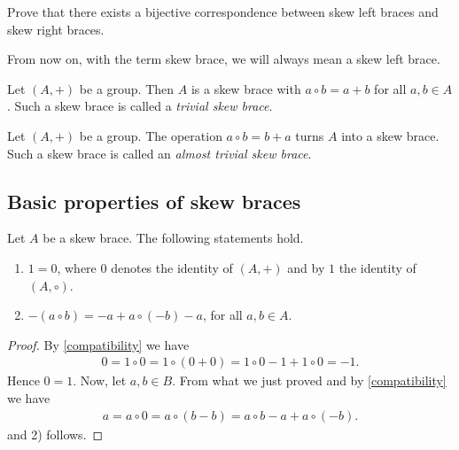    \begin{exercise}
        Prove that there exists a bijective correspondence between skew left braces
        and skew right braces.
   \end{exercise}

    \begin{convention}
        From now on, with the term skew brace, we will always mean a skew left brace.
    \end{convention}

        \begin{example}
        Let $(A,+)$ be a group. Then $A$ is a skew brace with
            $a\circ b=a+b$ for all $a,b\in A$. Such a skew brace is called a \emph{trivial skew brace}.
    \end{example}
    
    \begin{example}
          Let $(A,+)$ be a group. The operation $a\circ b=b+a$ turns $A$ into a skew brace. Such a skew brace is called an \emph{almost trivial skew brace}. 
    \end{example}

    
    \subsection{Basic properties of skew braces}

    \begin{lemma}\label{lem:propskew}
        Let $A$ be a skew brace. The following statements hold.
        \begin{enumerate}
            \item $1=0$, where $0$ denotes the identity of $(A,+)$ and by $1$ the identity of $(A,\circ)$.
            \item $-(a\circ b) = - a + a\circ(- b) - a$, for all $a,b \in A$.
        \end{enumerate}
    \end{lemma}
    \begin{proof}
        By \eqref{compatibility} we have
        \begin{align*}
            0= 1\circ 0 = 1 \circ (0+0) = 1\circ 0 -1 + 1 \circ 0 = -1.
        \end{align*}
        Hence $0=1$. 
        Now, let $a,b\in B$. From what we just proved and by \eqref{compatibility}
        we have 
        \begin{align*}
            a = a \circ 0 = a\circ (b-b) = a\circ b - a + a\circ (-b).
        \end{align*}
        and 2) follows. 
    \end{proof}
    
